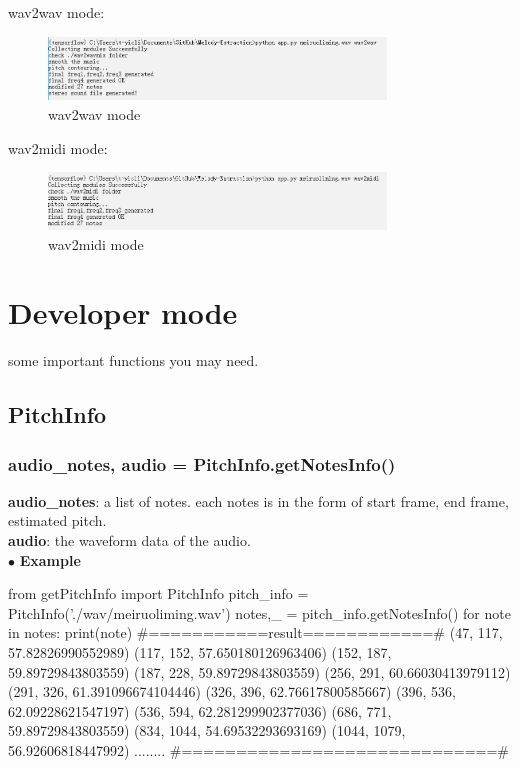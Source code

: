 \documentclass[twoside]{article}
\begin{document}
wav2wav mode:
\begin{figure}[H]
   \centering
   \includegraphics[width = 0.8\textwidth]{wav2wav.PNG}  
   \caption{wav2wav mode}
\end{figure}

wav2midi mode:
\begin{figure}[H]
   \centering
   \includegraphics[width = 0.8\textwidth]{wav2midi.PNG}  
   \caption{wav2midi mode}
\end{figure}

\section{Developer mode}
some important functions you may need. 

\subsection{PitchInfo}
\subsubsection{audio\_notes, audio = PitchInfo.getNotesInfo()}
\textbf{audio\_notes}: a list of notes. each notes is in the form of start frame, end frame, estimated pitch.\\
\textbf{audio}: the waveform data of the audio. \\

\noindent $\bullet$ \textbf{Example}
\begin{python}
from getPitchInfo import PitchInfo
pitch_info = PitchInfo('./wav/meiruoliming.wav')
notes,_ = pitch_info.getNotesInfo()
for note in notes:
	print(note)
#===========result============#
(47, 117, 57.82826990552989)
(117, 152, 57.650180126963406)
(152, 187, 59.89729843803559)
(187, 228, 59.89729843803559)
(256, 291, 60.66030413979112)
(291, 326, 61.391096674104446)
(326, 396, 62.76617800585667)
(396, 536, 62.09228621547197)
(536, 594, 62.281299902377036)
(686, 771, 59.89729843803559)
(834, 1044, 54.69532293693169)
(1044, 1079, 56.92606818447992)
........
#=============================#
\end{python}
\end{document}
